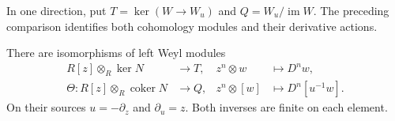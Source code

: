 In one direction, put
\(T=\ker(W\to W_u)\) and \(Q=W_u/\operatorname{im}W\).
The preceding comparison identifies both cohomology modules and
their derivative actions.

\begin{proposition}
\label{ns:prop:cohomology}
There are isomorphisms of left Weyl modules
\begin{align}
 R[z]\otimes_R\ker N&\longrightarrow T,&
 z^n\otimes w&\longmapsto D^nw,\label{ns:eq:torsion-map}\\
 \Theta:R[z]\otimes_R\operatorname{coker}N&\longrightarrow Q,&
 z^n\otimes[w]&\longmapsto D^n[u^{-1}w].\label{ns:eq:quotient-map}
\end{align}
On their sources \(u=-\partial_z\) and \(\partial_u=z\).
Both inverses are finite on each element.
\end{proposition}

